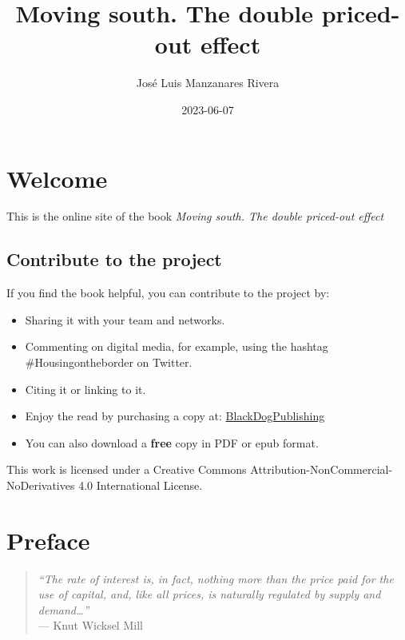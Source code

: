 \documentclass[
]{book}
\title{Moving south. The double priced-out effect}
\author{José Luis Manzanares Rivera}
\date{2023-06-07}
\providecommand{\tightlist}{%
  \setlength{\itemsep}{0pt}\setlength{\parskip}{0pt}}
\begin{document}
\maketitle

{
\hypersetup{linkcolor=}
\setcounter{tocdepth}{1}
\tableofcontents
}
\hypertarget{welcome}{%
\chapter*{Welcome}\label{welcome}}

This is the online site of the book \emph{Moving south. The double priced-out effect}

\hypertarget{contribute-to-the-project}{%
\section*{Contribute to the project}\label{contribute-to-the-project}}

If you find the book helpful, you can contribute to the project by:

\begin{itemize}
\tightlist
\item
  Sharing it with your team and networks.
\item
  Commenting on digital media, for example, using the hashtag \#Housingontheborder on Twitter.
\item
  Citing it or linking to it.
\item
  Enjoy the read by purchasing a copy at: \href{https://insight4health.netlify.app/}{BlackDogPublishing}
\item
  You can also download a \textbf{free} copy in PDF or epub format.
\end{itemize}

This work is licensed under a Creative Commons Attribution-NonCommercial-NoDerivatives 4.0 International License.

\hypertarget{preface}{%
\chapter*{Preface}\label{preface}}

\begin{quote}
\emph{``The rate of interest is, in fact, nothing more than the price paid for the use of capital, and, like all prices, is naturally regulated by supply and demand\ldots{}''}\\

--- Knut Wicksel Mill
\end{quote}
\end{document}
